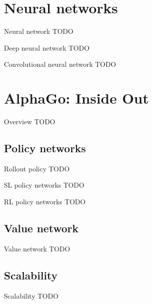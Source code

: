 \documentclass{beamer}
\newcommand{\todo}{\alert{TODO}}
\begin{document}

  \section{Neural networks}
  \begin{frame}{Neural network}
    \todo
  \end{frame}

  \begin{frame}{Deep neural network}
    \todo
  \end{frame}

  \begin{frame}{Convolutional neural network}
    \todo
  \end{frame}


  \section{AlphaGo: Inside Out}
  \begin{frame}{Overview}
    \todo
  \end{frame}

  \subsection{Policy networks}
  \begin{frame}{Rollout policy}
    \todo
  \end{frame}

  \begin{frame}{SL policy networks}
    \todo
  \end{frame}

  \begin{frame}{RL policy networks}
    \todo
  \end{frame}

  \subsection{Value network}
  \begin{frame}{Value network}
    \todo
  \end{frame}

  \subsection{Scalability}
  \begin{frame}{Scalability}
    \todo
  \end{frame}
\end{document}
